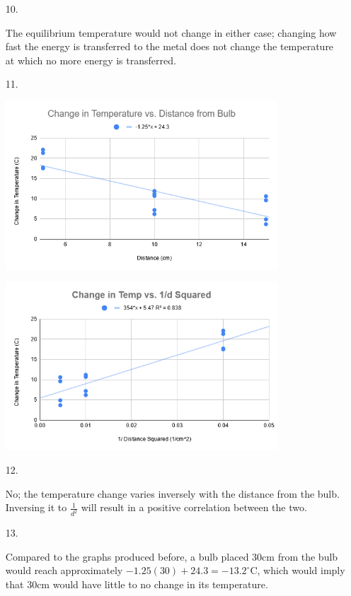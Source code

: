 ﻿\documentclass[12pt, letterpaper]{article}
\begin{document}
    \begin{enumerate}
        \item [10.]\mbox{}
        \begin{mdframed}
            The equilibrium temperature would not change in either case; changing how fast the energy is transferred to the metal does not change the temperature at which no more energy is transferred.
        \end{mdframed}

        \item [11.]\mbox{}
        \begin{mdframed}
            \begin{center}
                \includegraphics[width=0.8\textwidth]{q11-2.png}

                \includegraphics[width=0.8\textwidth]{q11.png}
            \end{center}
        \end{mdframed}

        \item [12.]\mbox{}
        \begin{mdframed}
            No; the temperature change varies inversely with the distance from the bulb. Inversing it to $\frac{1}{d^2}$ will result in a positive correlation between the two.
        \end{mdframed}
        
        \pagebreak

        \item [13.]\mbox{}
        \begin{mdframed}
            Compared to the graphs produced before, a bulb placed 30cm from the bulb would reach approximately $-1.25(30)+24.3 = -13.2^{\circ}$C, which would imply that 30cm would have little to no change in its temperature.
        \end{mdframed}
    \end{enumerate}
    
\end{document}
